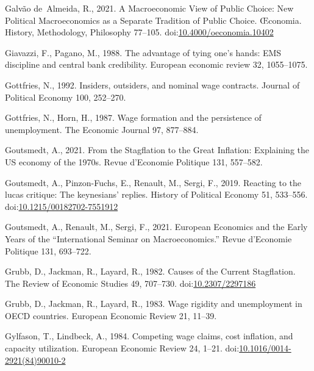 \documentclass[
  12pt,
  onecolumn]{article}
\newlength{\cslhangindent}
\newlength{\cslentryspacingunit} %
\newenvironment{CSLReferences}[2] %
 {%
  \setlength{\parindent}{0pt}
  \ifodd #1
  \let\oldpar\par
  \def\par{\hangindent=\cslhangindent\oldpar}
  \fi
  \setlength{\parskip}{#2\cslentryspacingunit}
 }%
 {}
\begin{document}
\begin{CSLReferences}{1}{0}
\leavevmode{}%
Galvão de~Almeida, R., 2021. A {Macroeconomic View} of {Public Choice}: {New Political Macroeconomics} as a {Separate Tradition} of {Public Choice}. Œconomia. History, Methodology, Philosophy 77--105. doi:\href{https://doi.org/10.4000/oeconomia.10402}{10.4000/oeconomia.10402}

\leavevmode{}%
Giavazzi, F., Pagano, M., 1988. The advantage of tying one's hands: {EMS} discipline and central bank credibility. European economic review 32, 1055--1075.

\leavevmode{}%
Gottfries, N., 1992. Insiders, outsiders, and nominal wage contracts. Journal of Political Economy 100, 252--270.

\leavevmode{}%
Gottfries, N., Horn, H., 1987. Wage formation and the persistence of unemployment. The Economic Journal 97, 877--884.

\leavevmode{}%
Goutsmedt, A., 2021. From the {Stagflation} to the {Great Inflation}: {Explaining} the {US} economy of the 1970s. Revue d'Economie Politique 131, 557--582.

\leavevmode{}%
Goutsmedt, A., Pinzon-Fuchs, E., Renault, M., Sergi, F., 2019. Reacting to the lucas critique: {The} keynesians' replies. History of Political Economy 51, 533--556. doi:\href{https://doi.org/10.1215/00182702-7551912}{10.1215/00182702-7551912}

\leavevmode{}%
Goutsmedt, A., Renault, M., Sergi, F., 2021. European {Economics} and the {Early Years} of the {``{International Seminar} on {Macroeconomics}.''} Revue d'Economie Politique 131, 693--722.

\leavevmode{}%
Grubb, D., Jackman, R., Layard, R., 1982. Causes of the {Current Stagflation}. The Review of Economic Studies 49, 707--730. doi:\href{https://doi.org/10.2307/2297186}{10.2307/2297186}

\leavevmode{}%
Grubb, D., Jackman, R., Layard, R., 1983. Wage rigidity and unemployment in {OECD} countries. European Economic Review 21, 11--39.

\leavevmode{}%
Gylfason, T., Lindbeck, A., 1984. Competing wage claims, cost inflation, and capacity utilization. European Economic Review 24, 1--21. doi:\href{https://doi.org/10.1016/0014-2921(84)90010-2}{10.1016/0014-2921(84)90010-2}


\end{CSLReferences}
\end{document}
